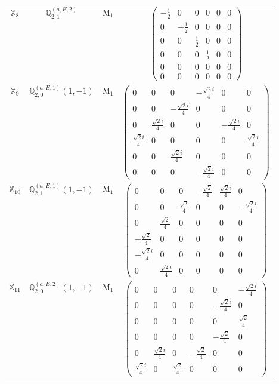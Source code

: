 \documentclass[fleqn,10pt,landscape]{article}
\begin{document}
\begin{itemize}
\begin{center}
\begin{longtable}{c|c|c|c}
$ \mathbb{X}_{8} $ & $\mathbb{Q}_{2,1}^{(a,E,2)}$ & M$_{1}$ & $\begin{pmatrix} - \frac{1}{2} & 0 & 0 & 0 & 0 & 0 \\ 0 & - \frac{1}{2} & 0 & 0 & 0 & 0 \\ 0 & 0 & \frac{1}{2} & 0 & 0 & 0 \\ 0 & 0 & 0 & \frac{1}{2} & 0 & 0 \\ 0 & 0 & 0 & 0 & 0 & 0 \\ 0 & 0 & 0 & 0 & 0 & 0 \end{pmatrix}$ \\
$ \mathbb{X}_{9} $ & $\mathbb{Q}_{2,0}^{(a,E,1)}(1,-1)$ & M$_{1}$ & $\begin{pmatrix} 0 & 0 & 0 & - \frac{\sqrt{2} i}{4} & 0 & 0 \\ 0 & 0 & - \frac{\sqrt{2} i}{4} & 0 & 0 & 0 \\ 0 & \frac{\sqrt{2} i}{4} & 0 & 0 & - \frac{\sqrt{2} i}{4} & 0 \\ \frac{\sqrt{2} i}{4} & 0 & 0 & 0 & 0 & \frac{\sqrt{2} i}{4} \\ 0 & 0 & \frac{\sqrt{2} i}{4} & 0 & 0 & 0 \\ 0 & 0 & 0 & - \frac{\sqrt{2} i}{4} & 0 & 0 \end{pmatrix}$ \\
$ \mathbb{X}_{10} $ & $\mathbb{Q}_{2,1}^{(a,E,1)}(1,-1)$ & M$_{1}$ & $\begin{pmatrix} 0 & 0 & 0 & - \frac{\sqrt{2}}{4} & \frac{\sqrt{2} i}{4} & 0 \\ 0 & 0 & \frac{\sqrt{2}}{4} & 0 & 0 & - \frac{\sqrt{2} i}{4} \\ 0 & \frac{\sqrt{2}}{4} & 0 & 0 & 0 & 0 \\ - \frac{\sqrt{2}}{4} & 0 & 0 & 0 & 0 & 0 \\ - \frac{\sqrt{2} i}{4} & 0 & 0 & 0 & 0 & 0 \\ 0 & \frac{\sqrt{2} i}{4} & 0 & 0 & 0 & 0 \end{pmatrix}$ \\
$ \mathbb{X}_{11} $ & $\mathbb{Q}_{2,0}^{(a,E,2)}(1,-1)$ & M$_{1}$ & $\begin{pmatrix} 0 & 0 & 0 & 0 & 0 & - \frac{\sqrt{2} i}{4} \\ 0 & 0 & 0 & 0 & - \frac{\sqrt{2} i}{4} & 0 \\ 0 & 0 & 0 & 0 & 0 & \frac{\sqrt{2}}{4} \\ 0 & 0 & 0 & 0 & - \frac{\sqrt{2}}{4} & 0 \\ 0 & \frac{\sqrt{2} i}{4} & 0 & - \frac{\sqrt{2}}{4} & 0 & 0 \\ \frac{\sqrt{2} i}{4} & 0 & \frac{\sqrt{2}}{4} & 0 & 0 & 0 \end{pmatrix}$ \\

\end{longtable}
\end{center}
\end{itemize}
\end{document}
